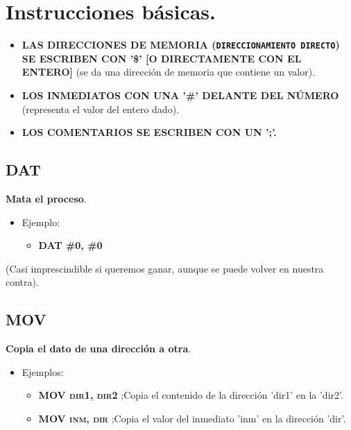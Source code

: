 \newpage
\section{Instrucciones básicas.}

\begin{tcolorbox}
    \begin{itemize}
        \item \textbf{LAS DIRECCIONES DE MEMORIA (\texttt{DIRECCIONAMIENTO DIRECTO}) SE ESCRIBEN CON '\$' [O DIRECTAMENTE CON EL ENTERO]} (se da una dirección de memoria que contiene un valor).
        \item \textbf{LOS INMEDIATOS CON UNA '\#' DELANTE DEL \newline NÚMERO} (representa el valor del entero dado).
        \item \textbf{LOS COMENTARIOS SE ESCRIBEN CON UN ';'.}
    \end{itemize}
\end{tcolorbox}

\subsection{DAT}
\noindent
\textbf{Mata el proceso}. 
\begin{itemize}
    \item Ejemplo:
    \begin{itemize}
        \item \textbf{\textsc{DAT \#0, \#0}}
    \end{itemize}
\end{itemize}

\newline (Casi imprescindible si queremos ganar, aunque se puede volver en nuestra contra).

\subsection{MOV}
\noindent
\textbf{Copia el dato de una dirección a otra}.
\begin{itemize}
    \item Ejemplos:
    \begin{itemize}
        \item \textbf{\textsc{MOV dir1, dir2}} ;Copia el contenido de la dirección 'dir1' en la 'dir2'.
        \item \textbf{\textsc{MOV inm, dir}} ;Copia el valor del inmediato 'inm' en la dirección 'dir'.
    \end{itemize}
\end{itemize}


